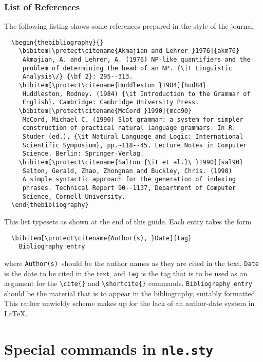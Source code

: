 \documentclass{cnle}
\begin{document}
\subsubsection{List of References}\label{fullref}

The following listing shows some references prepared in the style of the
journal.
%
\begin{verbatim}
  \begin{thebibliography}{}
    \bibitem[\protect\citename{Akmajian and Lehrer }1976]{akm76}
     Akmajian, A. and Lehrer, A. (1976) NP-like quantifiers and the
     problem of determining the head of an NP. {\it Linguistic
     Analysis\/} {\bf 2}: 295--313.
    \bibitem[\protect\citename{Huddleston }1984]{hud84}
     Huddleston, Rodney. (1984) {\it Introduction to the Grammar of
     English}. Cambridge: Cambridge University Press.
    \bibitem[\protect\citename{McCord }1990]{mcc90}
     McCord, Michael C. (1990) Slot grammar: a system for simpler
     construction of practical natural language grammars. In R.
     Studer (ed.), {\it Natural Language and Logic: International
     Scientific Symposium}, pp.~118--45. Lecture Notes in Computer
     Science. Berlin: Springer-Verlag.
    \bibitem[\protect\citename{Salton {\it et al.}\ }1990]{sal90}
     Salton, Gerald, Zhao, Zhongnan and Buckley, Chris. (1990)
     A simple syntactic approach for the generation of indexing
     phrases. Technical Report 90--1137, Department of Computer
     Science, Cornell University.
  \end{thebibliography}
\end{verbatim}
%
This list typesets as shown at the end of this guide.
Each entry takes the form
%
\begin{verbatim}
  \bibitem[\protect\citename{Author(s), }Date]{tag}
    Bibliography entry
\end{verbatim}
%
where \verb"Author(s)"\ should be the author names as they are cited in
the text, \verb"Date" is the date to be cited in the text, and \verb"tag"
is the tag that is to be used as an argument for the \verb"\cite{}" and
\verb"\shortcite{}" commands. \verb"Bibliography entry" should be the
material that is to appear in the bibliography, suitably formatted.  This
rather unwieldy scheme makes up for the lack of an author-date system in
\LaTeX.

\appendix
\section{Special commands in {\tt nle.sty}}
\end{document}
